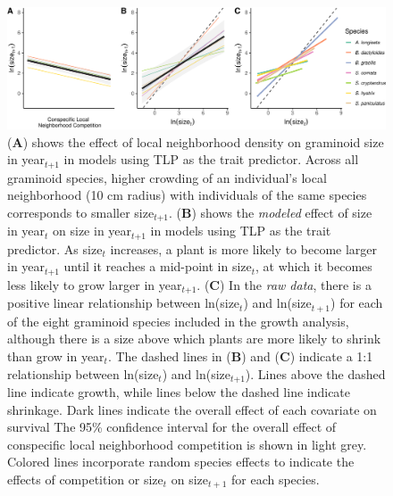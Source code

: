 \documentclass[12pt, letterpaper]{article}
\begin{document}
\begin{figure}[h]
  \centering
  \includegraphics[width=1\textwidth]{figures/growthEffectPlots-1.pdf}
  \caption{\internallinenumbers(\textbf{A}) shows the effect of local neighborhood density on graminoid size in year$_\textit{t+1}$ in models using TLP as the trait predictor. Across all graminoid species, higher crowding of an individual’s local neighborhood (10 cm radius) with individuals of the same species corresponds to smaller size$_\textit{t+1}$. (\textbf{B}) shows the \textit{modeled} effect of size in year$_\textit{t}$ on size in year$_\textit{t+1}$ in models using TLP as the trait predictor. As size$_\textit{t}$ increases, a plant is more likely to become larger in year$_\textit{t+1}$ until it reaches a mid-point in size$_\textit{t}$, at which it becomes less likely to grow larger in year$_\textit{t+1}$. (\textbf{C}) In the \textit{raw data}, there is a positive linear relationship between ln(size$_\textit{t}$) and ln(size$_{t+1}$) for each of the eight graminoid species included in the growth analysis, although there is a size above which plants are more likely to shrink than grow in year$_\textit{t}$. The dashed lines in (\textbf{B}) and (\textbf{C}) indicate a 1:1 relationship between ln(size$_\textit{t}$) and ln(size$_\textit{t+1}$). Lines above the dashed line indicate growth, while lines below the dashed line indicate shrinkage. Dark lines indicate the overall effect of each covariate on survival The 95\% confidence interval for the overall effect of conspecific local neighborhood competition is shown in light grey. Colored lines incorporate random species effects to indicate the effects of competition or size$_{t}$ on size$_{t+1}$ for each species. 
  }
  \label{fig:Effects_Growth}
\end{figure}
\end{document}
